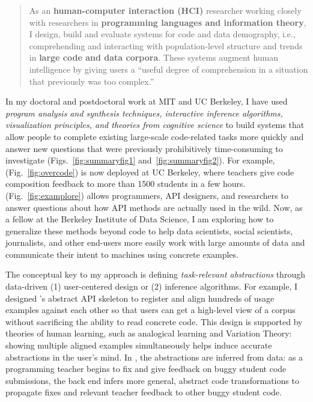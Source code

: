 \documentclass[justified]{tufte-handout}
\begin{document}
\begin{abstract}
\noindent 
As an \textbf{human-computer interaction (HCI)} researcher working closely with researchers in \textbf{programming languages and information theory},
I design, build and evaluate systems for code and data demography, i.e., comprehending and interacting with population-level structure and trends in \textbf{large code and data corpora}. These systems augment human intelligence by giving users a ``useful degree of comprehension in a situation that previously was too complex.''\cite{engelbart1962} 
\end{abstract}

In my doctoral and postdoctoral work at MIT and UC Berkeley, I have used \emph{program analysis and synthesis techniques, interactive inference algorithms, visualization principles, and theories from cognitive science} to build systems that allow people to complete existing large-scale code-related tasks more quickly and answer new questions that were previously prohibitively time-consuming to investigate (Figs.~\ref{fig:summaryfig1} and~\ref{fig:summaryfig2}). For example,  (Fig.~\ref{fig:overcode}) is now deployed at UC Berkeley, where teachers give code composition feedback to more than 1500 students in a few hours.\cite{overcode}  (Fig.~\ref{fig:examplore}) allows programmers, API designers, and researchers to answer questions about how API methods are actually used in the wild.\cite{examplore} Now, as a fellow at the Berkeley Institute of Data Science, I am exploring how to generalize these methods beyond code to help data scientists, social scientists, journalists, and other end-users more easily work with large amounts of data and communicate their intent to machines using concrete examples. 

The conceptual key to my approach is defining \emph{task-relevant abstractions} through data-driven (1) user-centered design or (2) inference algorithms. For example, I designed 's abstract API skeleton to register and align hundreds of usage examples against each other so that users can get a high-level view of a corpus without sacrificing the ability to read concrete code. This design is supported by theories of human learning, such as analogical learning and Variation Theory: showing multiple aligned examples simultaneously helps induce accurate abstractions in the user's mind. In , the abstractions are inferred from data: as a programming teacher begins to fix and give feedback on buggy student code submissions, the back end infers more general, abstract code transformations to propagate fixes and relevant teacher feedback to other buggy student code.\cite{lats17} 
\end{document}
